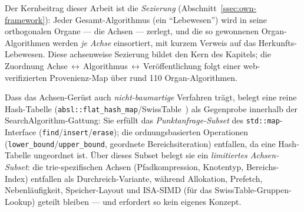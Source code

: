 Der Kernbeitrag dieser Arbeit ist die \emph{Sezierung} (Abschnitt~\ref{ssec:own-framework}): Jeder
Gesamt-Algorithmus (ein \enquote{Lebewesen}) wird in seine orthogonalen Organe --- die Achsen ---
zerlegt, und die so gewonnenen Organ-Algorithmen werden \emph{je Achse} einsortiert, mit kurzem
Verweis auf das Herkunfts-Lebewesen. Diese achsenweise Sezierung bildet den Kern des Kapitels; die
Zuordnung Achse\,$\leftrightarrow$\,Algorithmus\,$\leftrightarrow$\,Veröffentlichung folgt einer
web-verifizierten Provenienz-Map über rund 110 Organ-Algorithmen.

Dass das Achsen-Gerüst auch \emph{nicht-baumartige} Verfahren trägt, belegt eine reine Hash-Tabelle
(\texttt{absl::flat\_hash\_map}/SwissTable~\cite{abseil_swisstable}) als Gegenprobe innerhalb der
SearchAlgorithm-Gattung: Sie erfüllt das \emph{Punktanfrage-Subset} des \texttt{std::map}-Interface
(\texttt{find}/\texttt{insert}/\texttt{erase}); die ordnungsbasierten Operationen
(\texttt{lower\_bound}/\texttt{upper\_bound}, geordnete Bereichsiteration) entfallen, da eine
Hash-Tabelle ungeordnet ist. Über dieses Subset belegt sie ein \emph{limitiertes Achsen-Subset}: die
trie-spezifischen Achsen (Pfadkompression, Knotentyp, Bereichs-Index) entfallen als
Durchreich-Variante, während Allokation, Prefetch, Nebenläufigkeit, Speicher-Layout und ISA-SIMD
(für das SwissTable-Gruppen-Lookup) geteilt bleiben --- und erfordert so kein eigenes Konzept.

